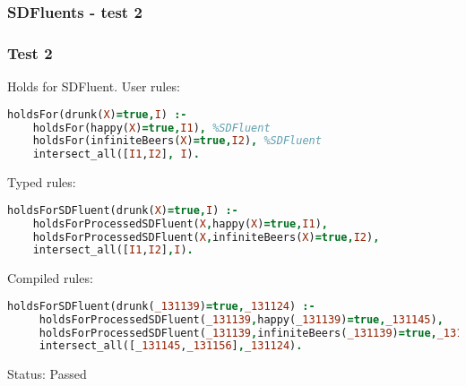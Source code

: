 \documentclass[8pt]{beamer}
\begin{document}
\begin{frame}[fragile]
\frametitle{SDFluents - test 2}
\subsubsection{Test 2}
\small
Holds for SDFluent.\linebreak
User rules:
\begin{tiny}
\begin{lstlisting}[language=Prolog]
holdsFor(drunk(X)=true,I) :-
    holdsFor(happy(X)=true,I1), %SDFluent
    holdsFor(infiniteBeers(X)=true,I2), %SDFluent
    intersect_all([I1,I2], I).
\end{lstlisting}
\end{tiny}
Typed rules:
\begin{tiny}
\begin{lstlisting}[language=Prolog]
holdsForSDFluent(drunk(X)=true,I) :-
    holdsForProcessedSDFluent(X,happy(X)=true,I1),
    holdsForProcessedSDFluent(X,infiniteBeers(X)=true,I2),
    intersect_all([I1,I2],I).
\end{lstlisting}
\end{tiny}
Compiled rules:
\begin{tiny}
\begin{lstlisting}[language=Prolog]
holdsForSDFluent(drunk(_131139)=true,_131124) :-
     holdsForProcessedSDFluent(_131139,happy(_131139)=true,_131145),
     holdsForProcessedSDFluent(_131139,infiniteBeers(_131139)=true,_131156),
     intersect_all([_131145,_131156],_131124).
\end{lstlisting}
\end{tiny}
Status: Passed
\end{frame}
\end{document}
